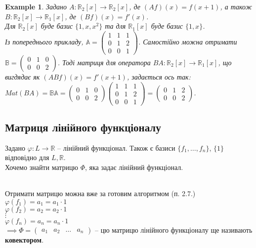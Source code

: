\documentclass[a4paper, 10pt]{article}
\theoremstyle{theoremdd}
\newtheorem{example}[theorem]{Example}
\begin{document}
	\begin{example}
	Задано $A \colon \mathbb{R}_2[x] \to \mathbb{R}_2[x]$, де $(Af)(x) = f(x+1)$, а також $B \colon \mathbb{R}_2[x] \to \mathbb{R}_1[x]$, де $(Bf)(x) = f'(x)$.\\
	Для $\mathbb{R}_2[x]$ буде базис $\{1,x,x^2\}$ та для $\mathbb{R}_1[x]$ буде базис $\{1,x\}$.\\
	Із попереднього прикладу, $\mathbb{A} = \begin{pmatrix}
	1 & 1 & 1 \\
	0 & 1 & 2 \\
	0 & 0 & 1
	\end{pmatrix}$. Самостійно можна отримати $\mathbb{B} = \begin{pmatrix}
	0 & 1 & 0 \\
	0 & 0 & 2
	\end{pmatrix}$. Тоді матриця для оператора $BA \colon \mathbb{R}_2[x] \to \mathbb{R}_1[x]$, що вигдядає як $(ABf)(x) = f'(x+1)$, задається ось так:\\
	$Mat (BA) = \mathbb{B} \mathbb{A} =  \begin{pmatrix}
	0 & 1 & 0 \\
	0 & 0 & 2
	\end{pmatrix} \begin{pmatrix}
	1 & 1 & 1 \\
	0 & 1 & 2 \\
	0 & 0 & 1
	\end{pmatrix} = \begin{pmatrix}
	0 & 1 & 2 \\
	0 & 0 & 2
	\end{pmatrix}$.
	\end{example}	
	
	\subsection{Матриця лінійного функціоналу}
	Задано $\varphi \colon L \to \mathbb{R}$ -- лінійний функціонал. Також є базиси $\{f_1,\dots,f_n\}$, $\{1\}$ відповідно для $L,\mathbb{R}$.\\
	Хочемо знайти матрицю $\Phi$, яка задає лінійний функціонал.\\
	\\
Отримати матрицю можна вже за готовим алгоритмом (п. 2.7.)\\
	$\varphi(f_1) = a_1 = a_1 \cdot 1$\\
	$\varphi(f_2) = a_2 = a_2 \cdot 1$\\
	$\vdots$\\
	$\varphi(f_n) = a_n = a_n \cdot 1$\\
	$\implies \Phi = \begin{pmatrix} a_1 & a_2 & \dots & a_n \end{pmatrix}$ -- цю матрицю лінійного функціоналу ще називають \textbf{ковектором}.
\end{document}
